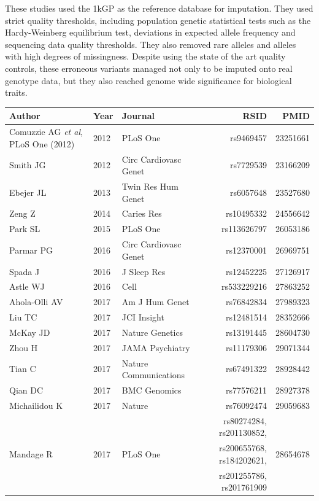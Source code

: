 \documentclass[9pt,lineno]{elife}
\begin{document}
These studies used the 1kGP as the reference database for imputation. %
They used strict quality thresholds, including population genetic statistical tests such as the Hardy-Weinberg equilibrium test, deviations in expected allele frequency and sequencing data quality thresholds. 
They also removed rare alleles and alleles with high degrees of missingness. 
Despite using the state of the art quality controls, these erroneous variants managed not only to be imputed onto real genotype data, but they also reached genome wide significance for biological traits. 

\begin{center}
 \begin{tabular}{l l l r r} 
 \hline
Author & Year & Journal & RSID & PMID \\ [0.5ex] 
 \hline
Comuzzie AG \emph{et al}, PLoS One (2012)  &	2012	 &PLoS One &	rs9469457&23251661\\ 
 
Smith JG &	2012	 & Circ Cardiovasc Genet	& rs7729539&23166209\\ 
 
Ebejer JL	& 2013	 & Twin Res Hum Genet & 	rs6057648&23527680\\ 
 
Zeng Z	& 2014 &	Caries Res	& rs10495332&24556642\\ 
 
Park SL & 	2015	 & PLoS One	& rs113626797&26053186\\ 
 
Parmar PG &	2016	 & Circ Cardiovasc Genet	& rs12370001&26969751\\ 
 
Spada J & 	2016	 & J Sleep Res &	rs12452225&27126917\\ 
Astle WJ	& 2016 &	Cell	 & rs533229216&27863252\\ 
 
 Ahola-Olli AV &	2017 &	Am J Hum Genet &	rs76842834&27989323\\ 
 
Liu TC	& 2017 &	JCI Insight &	rs12481514&28352666\\ 
 
  McKay JD & 2017 &	Nature Genetics & 	rs13191445&28604730\\ 
 
Zhou H &	2017	 & JAMA Psychiatry &	rs11179306&	29071344\\ 
 
Tian C	& 2017	 &Nature Communications	 & rs67491322&28928442\\
 
Qian DC	& 2017 &	BMC Genomics &	rs77576211&28927378\\ 
 
Michailidou K	& 2017	 & Nature &	rs76092474&29059683\\ 
 
& & & rs80274284, rs201130852,&\\
Mandage R &	2017	 & PLoS One	 & rs200655768, rs184202621,&28654678\\
& & & rs201255786, rs201761909&\\
 \hline
 \end{tabular}
\end{center}
\end{document}
